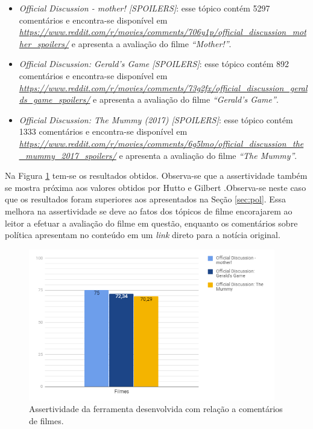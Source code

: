 \begin{itemize}
  \item
  \textit{Official Discussion - mother! [SPOILERS]}: esse tópico contém 5297
  comentários e encontra-se disponível em
  \textit{\url{https://www.reddit.com/r/movies/comments/706y1p/official_discussion_mother_spoilers/}}
  e apresenta a avaliação do filme \textit{``Mother!''}.
  \item
  \textit{Official Discussion: Gerald's Game [SPOILERS]}: esse tópico contém 892
  comentários e
  encontra-se disponível em
  \textit{\url{https://www.reddit.com/r/movies/comments/73g2fx/official_discussion_geralds_game_spoilers/}}
  e apresenta a avaliação do filme \textit{``Gerald's Game''}.
    \item
  \textit{Official Discussion: The Mummy (2017) [SPOILERS]}: esse tópico contém
  1333 comentários e
  encontra-se disponível em
  \textit{\url{https://www.reddit.com/r/movies/comments/6g5lmo/official_discussion_the_mummy_2017_spoilers/}}
  e apresenta a avaliação do filme \textit{``The Mummy''}.
  
\end{itemize}


Na Figura \ref{fig:fil1} tem-se os resultados obtidos. Observa-se que a
assertividade também se mostra próxima aos valores obtidos por Hutto e Gilbert
\cite{conf/icwsm/HuttoG14}.Observa-se neste caso que os resultados foram
superiores aos apresentados na Seção \ref{sec:pol}. Essa melhora na
assertividade se deve ao fatos dos tópicos de filme encorajarem ao
leitor a efetuar a avaliação do filme em questão, enquanto os comentários sobre
política apresentam no conteúdo em um \textit{link} direto para a notícia
original.


\begin{figure}[!htbp]
\centering
\includegraphics[height=250px]{imagens/filmes1.png}
\caption{Assertividade da ferramenta desenvolvida com relação a comentários de
filmes.}
\label{fig:fil1}
\end{figure}


